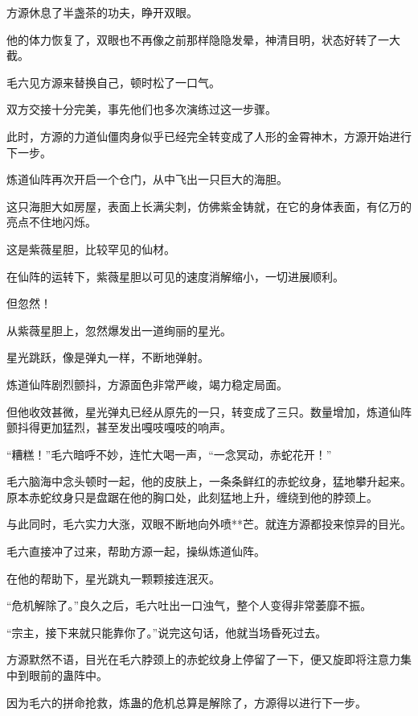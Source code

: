 
\begin{this_body}

方源休息了半盏茶的功夫，睁开双眼。

他的体力恢复了，双眼也不再像之前那样隐隐发晕，神清目明，状态好转了一大截。

毛六见方源来替换自己，顿时松了一口气。

双方交接十分完美，事先他们也多次演练过这一步骤。

此时，方源的力道仙僵肉身似乎已经完全转变成了人形的金霄神木，方源开始进行下一步。

炼道仙阵再次开启一个仓门，从中飞出一只巨大的海胆。

这只海胆大如房屋，表面上长满尖刺，仿佛紫金铸就，在它的身体表面，有亿万的亮点不住地闪烁。

这是紫薇星胆，比较罕见的仙材。

在仙阵的运转下，紫薇星胆以可见的速度消解缩小，一切进展顺利。

但忽然！

从紫薇星胆上，忽然爆发出一道绚丽的星光。

星光跳跃，像是弹丸一样，不断地弹射。

炼道仙阵剧烈颤抖，方源面色非常严峻，竭力稳定局面。

但他收效甚微，星光弹丸已经从原先的一只，转变成了三只。数量增加，炼道仙阵颤抖得更加猛烈，甚至发出嘎吱嘎吱的响声。

“糟糕！”毛六暗呼不妙，连忙大喝一声，“一念冥动，赤蛇花开！”

毛六脑海中念头顿时一起，他的皮肤上，一条条鲜红的赤蛇纹身，猛地攀升起来。原本赤蛇纹身只是盘踞在他的胸口处，此刻猛地上升，缠绕到他的脖颈上。

与此同时，毛六实力大涨，双眼不断地向外喷**芒。就连方源都投来惊异的目光。

毛六直接冲了过来，帮助方源一起，操纵炼道仙阵。

在他的帮助下，星光跳丸一颗颗接连泯灭。

“危机解除了。”良久之后，毛六吐出一口浊气，整个人变得非常萎靡不振。

“宗主，接下来就只能靠你了。”说完这句话，他就当场昏死过去。

方源默然不语，目光在毛六脖颈上的赤蛇纹身上停留了一下，便又旋即将注意力集中到眼前的蛊阵中。

因为毛六的拼命抢救，炼蛊的危机总算是解除了，方源得以进行下一步。


\end{this_body}

